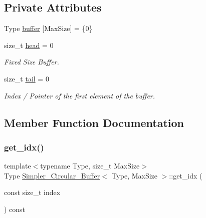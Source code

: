 \subsection*{Private Attributes}
\begin{DoxyCompactItemize}
\item 
Type \hyperlink{classSimpler__Circular__Buffer_a05808047d226985470e02e84b44bee9a}{buffer} \mbox{[}Max\+Size\mbox{]} = \{0\}
\item 
size\+\_\+t \hyperlink{classSimpler__Circular__Buffer_aa6fea0e7b9d4b57aa825dfe11aec3c25}{head} = 0
\begin{DoxyCompactList}\small\item\em Fixed Size Buffer. \end{DoxyCompactList}\item 
size\+\_\+t \hyperlink{classSimpler__Circular__Buffer_a2833e67d4d6cfae68e71306037015642}{tail} = 0
\begin{DoxyCompactList}\small\item\em Index / Pointer of the first element of the buffer. \end{DoxyCompactList}\end{DoxyCompactItemize}


\subsection{Member Function Documentation}
\mbox{\label{classSimpler__Circular__Buffer_a6bdde2ca6c814ec455b8ffa190a90c1e}} 
\subsubsection{\texorpdfstring{get\+\_\+idx()}{get\_idx()}}
{\footnotesize\ttfamily template$<$typename Type, size\+\_\+t Max\+Size$>$ \\
Type \hyperlink{classSimpler__Circular__Buffer}{Simpler\+\_\+\+Circular\+\_\+\+Buffer}$<$ Type, Max\+Size $>$\+::get\+\_\+idx (\begin{DoxyParamCaption}\item[{const size\+\_\+t}]{index }\end{DoxyParamCaption}) const\hspace{0.3cm}{\ttfamily [inline]}}



